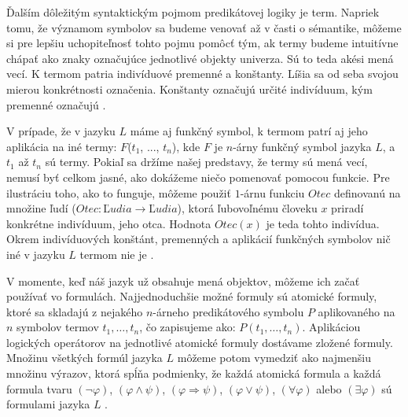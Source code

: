 \documentclass[12pt, letterpaper]{article}
\begin{document}
Ďalším dôležitým syntaktickým pojmom predikátovej logiky je term. Napriek tomu, že významom symbolov sa budeme venovať až v časti o sémantike, môžeme si pre lepšiu uchopiteľnosť tohto pojmu pomôcť tým, ak termy budeme intuitívne chápať ako znaky označujúce jednotlivé objekty univerza. Sú to teda akési mená vecí. K termom patria indivíduové premenné a konštanty. Líšia sa od seba svojou mierou konkrétnosti označenia. Konštanty označujú určité indivíduum, kým premenné označujú  \parencites[18]{raclavsky_uvod_2015}{shapiro_classical_2022}.\par
V prípade, že v jazyku $L$ máme aj funkčný symbol, k termom patrí aj jeho aplikácia na iné termy: $F$($t_1$, ..., $t_n$), kde $F$ je $n$-árny funkčný symbol jazyka $L$, a $t_1$ až $t_n$ sú termy. Pokiaľ sa držíme našej predstavy, že termy sú mená vecí, nemusí byť celkom jasné, ako dokážeme niečo pomenovať pomocou funkcie. Pre ilustráciu toho, ako to funguje, môžeme použiť $1$-árnu funkciu $Otec$ definovanú na množine ľudí ($Otec: Ľudia \rightarrow Ľudia$), ktorá ľubovoľnému človeku $x$ priradí konkrétne indivíduum, jeho otca. Hodnota $Otec(x)$ je teda  tohto indivídua.
Okrem indivíduových konštánt, premenných a aplikácií funkčných symbolov nič iné v jazyku $L$ termom nie je \parencites[47]{mendelson_introduction_2015}[35]{raclavsky_uvod_2015}[138]{svejdar_logika_2002}.\par

V momente, keď náš jazyk už obsahuje mená objektov, môžeme ich začať používať vo formulách. Najjednoduchšie možné formuly sú atomické formuly, ktoré sa skladajú z nejakého $n$-árneho predikátového symbolu $P$ aplikovaného na $n$ symbolov termov $t_1, \dots, t_n$, čo zapisujeme ako: $P(t_1, \dots, t_n)$. Aplikáciou logických operátorov na jednotlivé atomické formuly dostávame zložené formuly. Množinu všetkých formúl jazyka $L$ môžeme potom vymedziť ako najmenšiu množinu výrazov, ktorá spĺňa podmienky, že každá atomická formula a každá formula tvaru $(\neg\varphi)$, $(\varphi \land \psi)$, $(\varphi \Rightarrow \psi)$, $(\varphi \lor \psi)$, $(\forall\varphi)$ alebo $(\exists \varphi)$ sú formulami jazyka $L$ \parencites[35]{raclavsky_uvod_2015}{shapiro_classical_2022}[138]{svejdar_logika_2002}.\par
\end{document}
